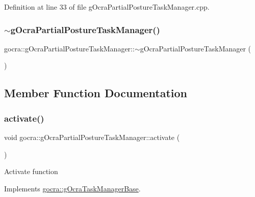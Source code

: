 Definition at line 33 of file g\+Ocra\+Partial\+Posture\+Task\+Manager.\+cpp.

\hypertarget{classgocra_1_1gOcraPartialPostureTaskManager_af34bf754f071b3212c850c3b11b3a6b2}{}\label{classgocra_1_1gOcraPartialPostureTaskManager_af34bf754f071b3212c850c3b11b3a6b2} 
\subsubsection{\texorpdfstring{$\sim$g\+Ocra\+Partial\+Posture\+Task\+Manager()}{~gOcraPartialPostureTaskManager()}}
{\footnotesize\ttfamily gocra\+::g\+Ocra\+Partial\+Posture\+Task\+Manager\+::$\sim$g\+Ocra\+Partial\+Posture\+Task\+Manager (\begin{DoxyParamCaption}{ }\end{DoxyParamCaption})}



\subsection{Member Function Documentation}
\hypertarget{classgocra_1_1gOcraPartialPostureTaskManager_ad33a136127d9cdb480748954dc0fd038}{}\label{classgocra_1_1gOcraPartialPostureTaskManager_ad33a136127d9cdb480748954dc0fd038} 
\subsubsection{\texorpdfstring{activate()}{activate()}}
{\footnotesize\ttfamily void gocra\+::g\+Ocra\+Partial\+Posture\+Task\+Manager\+::activate (\begin{DoxyParamCaption}{ }\end{DoxyParamCaption})\hspace{0.3cm}{\ttfamily [virtual]}}

Activate function 

Implements \hyperlink{classgocra_1_1gOcraTaskManagerBase_a50cf1c408749d6e9dcfaf50bcab77dee}{gocra\+::g\+Ocra\+Task\+Manager\+Base}.



